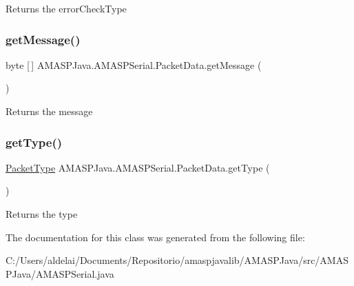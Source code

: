 \begin{DoxyReturn}{Returns}
the error\+Check\+Type 
\end{DoxyReturn}
\mbox{\label{class_a_m_a_s_p_java_1_1_a_m_a_s_p_serial_1_1_packet_data_a16431ee191945056369cd2a6159193cc}} 
\subsubsection{\texorpdfstring{get\+Message()}{getMessage()}}
{\footnotesize\ttfamily byte \mbox{[}$\,$\mbox{]} A\+M\+A\+S\+P\+Java.\+A\+M\+A\+S\+P\+Serial.\+Packet\+Data.\+get\+Message (\begin{DoxyParamCaption}{ }\end{DoxyParamCaption})}

\begin{DoxyReturn}{Returns}
the message 
\end{DoxyReturn}
\mbox{\label{class_a_m_a_s_p_java_1_1_a_m_a_s_p_serial_1_1_packet_data_a8a24093b1f2bafdbeb21e616351b4d6c}} 
\subsubsection{\texorpdfstring{get\+Type()}{getType()}}
{\footnotesize\ttfamily \hyperlink{enum_a_m_a_s_p_java_1_1_a_m_a_s_p_serial_1_1_packet_type}{Packet\+Type} A\+M\+A\+S\+P\+Java.\+A\+M\+A\+S\+P\+Serial.\+Packet\+Data.\+get\+Type (\begin{DoxyParamCaption}{ }\end{DoxyParamCaption})}

\begin{DoxyReturn}{Returns}
the type 
\end{DoxyReturn}


The documentation for this class was generated from the following file\+:\begin{DoxyCompactItemize}
\item 
C\+:/\+Users/aldelai/\+Documents/\+Repositorio/amaspjavalib/\+A\+M\+A\+S\+P\+Java/src/\+A\+M\+A\+S\+P\+Java/A\+M\+A\+S\+P\+Serial.\+java\end{DoxyCompactItemize}
